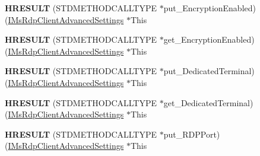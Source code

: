 \begin{DoxyCompactItemize}
\item 
\mbox{\label{struct_m_s_t_s_c_lib_1_1_i_ms_rdp_client_advanced_settings_vtbl_a3986a5332f585928d9775f0aacec218f}} 
{\bfseries H\+R\+E\+S\+U\+LT} (S\+T\+D\+M\+E\+T\+H\+O\+D\+C\+A\+L\+L\+T\+Y\+PE $\ast$put\+\_\+\+Encryption\+Enabled)(\hyperlink{interface_m_s_t_s_c_lib_1_1_i_ms_rdp_client_advanced_settings}{I\+Ms\+Rdp\+Client\+Advanced\+Settings} $\ast$This
\item 
\mbox{\label{struct_m_s_t_s_c_lib_1_1_i_ms_rdp_client_advanced_settings_vtbl_a618fb99f999191085f6ecbc6962e0c79}} 
{\bfseries H\+R\+E\+S\+U\+LT} (S\+T\+D\+M\+E\+T\+H\+O\+D\+C\+A\+L\+L\+T\+Y\+PE $\ast$get\+\_\+\+Encryption\+Enabled)(\hyperlink{interface_m_s_t_s_c_lib_1_1_i_ms_rdp_client_advanced_settings}{I\+Ms\+Rdp\+Client\+Advanced\+Settings} $\ast$This
\item 
\mbox{\label{struct_m_s_t_s_c_lib_1_1_i_ms_rdp_client_advanced_settings_vtbl_a6752daab9824e6ac7515a8cf7c97f383}} 
{\bfseries H\+R\+E\+S\+U\+LT} (S\+T\+D\+M\+E\+T\+H\+O\+D\+C\+A\+L\+L\+T\+Y\+PE $\ast$put\+\_\+\+Dedicated\+Terminal)(\hyperlink{interface_m_s_t_s_c_lib_1_1_i_ms_rdp_client_advanced_settings}{I\+Ms\+Rdp\+Client\+Advanced\+Settings} $\ast$This
\item 
\mbox{\label{struct_m_s_t_s_c_lib_1_1_i_ms_rdp_client_advanced_settings_vtbl_a03517b2a4b050bbd9efe030dcc91bb3d}} 
{\bfseries H\+R\+E\+S\+U\+LT} (S\+T\+D\+M\+E\+T\+H\+O\+D\+C\+A\+L\+L\+T\+Y\+PE $\ast$get\+\_\+\+Dedicated\+Terminal)(\hyperlink{interface_m_s_t_s_c_lib_1_1_i_ms_rdp_client_advanced_settings}{I\+Ms\+Rdp\+Client\+Advanced\+Settings} $\ast$This
\item 
\mbox{\label{struct_m_s_t_s_c_lib_1_1_i_ms_rdp_client_advanced_settings_vtbl_a25e702d2eb12450df677091d17d4a993}} 
{\bfseries H\+R\+E\+S\+U\+LT} (S\+T\+D\+M\+E\+T\+H\+O\+D\+C\+A\+L\+L\+T\+Y\+PE $\ast$put\+\_\+\+R\+D\+P\+Port)(\hyperlink{interface_m_s_t_s_c_lib_1_1_i_ms_rdp_client_advanced_settings}{I\+Ms\+Rdp\+Client\+Advanced\+Settings} $\ast$This
\item 

\end{DoxyCompactItemize}
